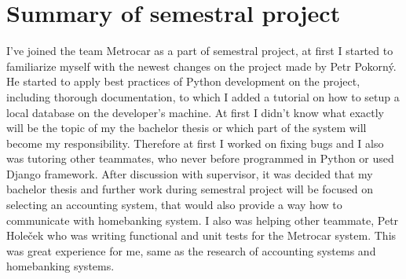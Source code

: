 \documentclass[11pt,twoside,a4paper]{book}
\begin{document}
\section{Summary of semestral project}
I've joined the team Metrocar as a part of semestral project, at first I started to familiarize myself with the newest 
changes on the project made by Petr Pokorný. He started to apply best practices of Python development on the project, including thorough documentation, to which I added a tutorial on how to setup a local database on the developer's machine. At first I didn't know what exactly will be the topic of my the bachelor thesis or which part of the system will become my responsibility. Therefore at first I worked on fixing bugs and I also was tutoring other teammates, who never before programmed in Python or used Django framework. After discussion with supervisor, it was decided that my bachelor thesis and further work during semestral project will be focused on selecting an accounting system, that would also provide a way how to communicate with homebanking system. I also was helping other teammate, Petr Holeček who was writing functional and unit tests for the Metrocar system. This was great experience for me, same as the research of accounting systems and homebanking systems. 

 


%




%
{
\def\CS{$\cal C\kern-0.1667em\lower.5ex\hbox{$\cal S$}\kern-0.075em $}

}

%
\end{document}
